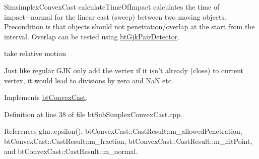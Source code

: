 SimsimplexConvexCast calculateTimeOfImpact calculates the time of impact+normal for the linear cast (sweep) between two moving objects. Precondition is that objects should not penetration/overlap at the start from the interval. Overlap can be tested using \hyperlink{classbt_gjk_pair_detector}{btGjkPairDetector}. 

take relative motion

Just like regular GJK only add the vertex if it isn't already (close) to current vertex, it would lead to divisions by zero and NaN etc. 

Implements \hyperlink{classbt_convex_cast_baf0f25a8cccfcafdaabada83c8d2bfb}{btConvexCast}.

Definition at line 38 of file btSubSimplexConvexCast.cpp.

References glm::epsilon(), btConvexCast::CastResult::m\_\-allowedPenetration, btConvexCast::CastResult::m\_\-fraction, btConvexCast::CastResult::m\_\-hitPoint, and btConvexCast::CastResult::m\_\-normal.

